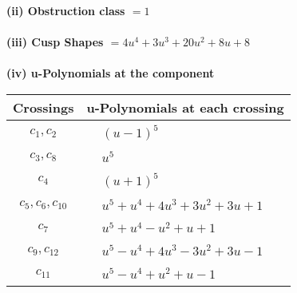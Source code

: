 \documentclass[1p]{elsarticle_modified}
\theoremstyle{definition}
\begin{document}
\flushleft \textbf{(ii) Obstruction class $= 1$}\\~\\
\flushleft \textbf{(iii) Cusp Shapes $= 4 u^4+3 u^3+20 u^2+8 u+8$}\\~\\
\newpage\renewcommand{\arraystretch}{1}
\flushleft \textbf{(iv) u-Polynomials at the component}\newline \\
\begin{tabular}{m{50pt}|m{274pt}}
Crossings & \hspace{64pt}u-Polynomials at each crossing \\
\hline $$\begin{aligned}c_{1},c_{2}\end{aligned}$$&$\begin{aligned}
&(u-1)^5
\end{aligned}$\\
\hline $$\begin{aligned}c_{3},c_{8}\end{aligned}$$&$\begin{aligned}
&u^5
\end{aligned}$\\
\hline $$\begin{aligned}c_{4}\end{aligned}$$&$\begin{aligned}
&(u+1)^5
\end{aligned}$\\
\hline $$\begin{aligned}c_{5},c_{6},c_{10}\end{aligned}$$&$\begin{aligned}
&u^5+u^4+4 u^3+3 u^2+3 u+1
\end{aligned}$\\
\hline $$\begin{aligned}c_{7}\end{aligned}$$&$\begin{aligned}
&u^5+u^4- u^2+u+1
\end{aligned}$\\
\hline $$\begin{aligned}c_{9},c_{12}\end{aligned}$$&$\begin{aligned}
&u^5- u^4+4 u^3-3 u^2+3 u-1
\end{aligned}$\\
\hline $$\begin{aligned}c_{11}\end{aligned}$$&$\begin{aligned}
&u^5- u^4+u^2+u-1
\end{aligned}$\\
\hline
\end{tabular}\\~\\
\end{document}
